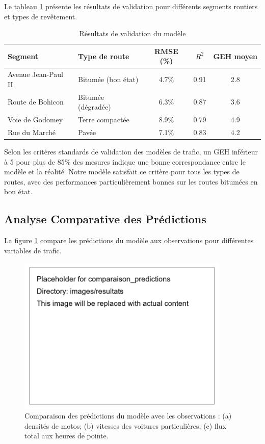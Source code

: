 Le tableau \ref{tab:resultats_validation} présente les résultats de validation pour différents segments routiers et types de revêtement.

\begin{table}[htbp]
\centering
\caption{Résultats de validation du modèle}
\label{tab:resultats_validation}
\begin{tabular}{llccc}
\toprule
\textbf{Segment} & \textbf{Type de route} & \textbf{RMSE (\%)} & \textbf{$R^2$} & \textbf{GEH moyen} \\
\midrule
Avenue Jean-Paul II & Bitumée (bon état) & 4.7\% & 0.91 & 2.8 \\
Route de Bohicon & Bitumée (dégradée) & 6.3\% & 0.87 & 3.6 \\
Voie de Godomey & Terre compactée & 8.9\% & 0.79 & 4.9 \\
Rue du Marché & Pavée & 7.1\% & 0.83 & 4.2 \\
\bottomrule
\end{tabular}
\end{table}

Selon les critères standards de validation des modèles de trafic, un GEH inférieur à 5 pour plus de 85\% des mesures indique une bonne correspondance entre le modèle et la réalité. Notre modèle satisfait ce critère pour tous les types de routes, avec des performances particulièrement bonnes sur les routes bitumées en bon état.

\subsection{Analyse Comparative des Prédictions}
\label{subsec:analyse_comparative}

La figure \ref{fig:comparaison_predictions} compare les prédictions du modèle aux observations pour différentes variables de trafic.

\begin{figure}[htbp]
\centering
\includegraphics[width=0.9\textwidth]{images/resultats/comparaison_predictions}
\caption{Comparaison des prédictions du modèle avec les observations : (a) densités de motos; (b) vitesses des voitures particulières; (c) flux total aux heures de pointe.}
\label{fig:comparaison_predictions}
\end{figure}

